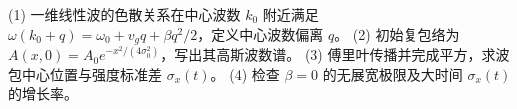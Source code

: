 (1) 一维线性波的色散关系在中心波数 \(k_0\) 附近满足 \(\omega(k_0+q)=\omega_0+v_gq+\beta q^2/2\)，定义中心波数偏离 \(q\)。
(2) 初始复包络为 \(A(x,0)=A_0e^{-x^2/(4\sigma_0^2)}\)，写出其高斯波数谱。
(3) 傅里叶传播并完成平方，求波包中心位置与强度标准差 \(\sigma_x(t)\)。
(4) 检查 \(\beta=0\) 的无展宽极限及大时间 \(\sigma_x(t)\) 的增长率。
